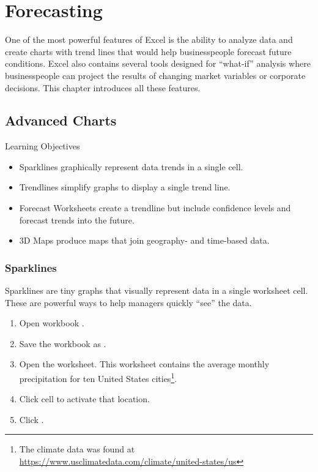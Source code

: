 \chapter{Forecasting}\label{ch08:forecasting}

One of the most powerful features of Excel is the ability to analyze data and create charts with trend lines that would help businesspeople forecast future conditions. Excel also contains several tools designed for ``what-if'' analysis where businesspeople can project the results of changing market variables or corporate decisions. This chapter introduces all these features. 

\section{Advanced Charts}

\begin{center}
	\begin{objbox}{Learning Objectives}
		\begin{itemize}
			\setlength{\itemsep}{0pt}
			\setlength{\parskip}{0pt}
			\setlength{\parsep}{0pt}
			
			\item Sparklines graphically represent data trends in a single cell.
			\item Trendlines simplify graphs to display a single trend line.
			\item Forecast Worksheets create a trendline but include confidence levels and forecast trends into the future.
			\item $ 3 $D Maps produce maps that join geography- and time-based data.

		\end{itemize}
	\end{objbox}
\end{center}

\subsection{Sparklines}

Sparklines are tiny graphs that visually represent data in a single worksheet cell. These are powerful ways to help managers quickly ``see'' the data.

\begin{enumerate}
	\item Open workbook .
	\item Save the workbook as .
	\item Open the  worksheet. This worksheet contains the average monthly precipitation for ten United States cities\footnote{The climate data was found at \url{https://www.usclimatedata.com/climate/united-states/us}}.
	\item Click cell  to activate that location.
	\item Click .
\end{enumerate}

